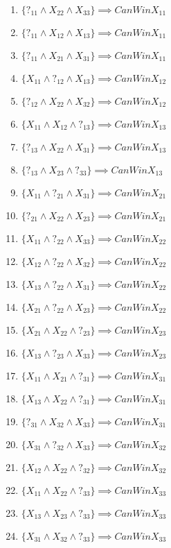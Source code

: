 \documentclass[22pt]{article}
\begin{document}
\begin{multicols}{2}
\begin{enumerate}
	\item $\{?_{11} \land X_{22} \land X_{33}\} \implies CanWinX_{11}$
	\item $\{?_{11} \land X_{12} \land X_{13}\} \implies CanWinX_{11}$
	\item $\{?_{11} \land X_{21} \land X_{31}\} \implies CanWinX_{11}$

	\item $\{X_{11} \land ?_{12} \land X_{13}\} \implies CanWinX_{12}$
	\item $\{?_{12} \land X_{22} \land X_{32}\} \implies CanWinX_{12}$

	\item $\{X_{11} \land X_{12} \land ?_{13}\} \implies CanWinX_{13}$
	\item $\{?_{13} \land X_{22} \land X_{31}\} \implies CanWinX_{13}$
	\item $\{?_{13} \land X_{23} \land ?_{33}\} \implies CanWinX_{13}$

	\item $\{X_{11} \land ?_{21} \land X_{31}\} \implies CanWinX_{21}$
	\item $\{?_{21} \land X_{22} \land X_{23}\} \implies CanWinX_{21}$

	\item $\{X_{11} \land ?_{22} \land X_{33}\} \implies CanWinX_{22}$
	\item $\{X_{12} \land ?_{22} \land X_{32}\} \implies CanWinX_{22}$
	\item $\{X_{13} \land ?_{22} \land X_{31}\} \implies CanWinX_{22}$
	\item $\{X_{21} \land ?_{22} \land X_{23}\} \implies CanWinX_{22}$

	\item $\{X_{21} \land X_{22} \land ?_{23}\} \implies CanWinX_{23}$
	\item $\{X_{13} \land ?_{23} \land X_{33}\} \implies CanWinX_{23}$

	\item $\{X_{11} \land X_{21} \land ?_{31}\} \implies CanWinX_{31}$
	\item $\{X_{13} \land X_{22} \land ?_{31}\} \implies CanWinX_{31}$
	\item $\{?_{31} \land X_{32} \land X_{33}\} \implies CanWinX_{31}$

	\item $\{X_{31} \land ?_{32} \land X_{33}\} \implies CanWinX_{32}$
	\item $\{X_{12} \land X_{22} \land ?_{32}\} \implies CanWinX_{32}$

	\item $\{X_{11} \land X_{22} \land ?_{33}\} \implies CanWinX_{33}$
	\item $\{X_{13} \land X_{23} \land ?_{33}\} \implies CanWinX_{33}$
	\item $\{X_{31} \land X_{32} \land ?_{33}\} \implies CanWinX_{33}$
\end{enumerate}
\end{multicols}
\end{document}

